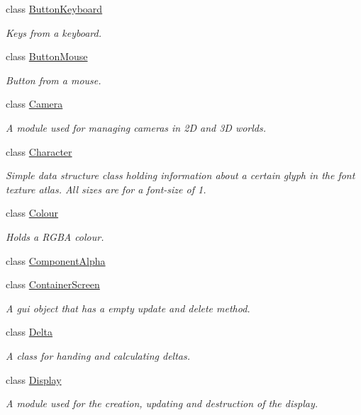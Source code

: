 \begin{DoxyCompactItemize}
class \hyperlink{class_flounder_1_1_button_keyboard}{Button\+Keyboard}
\begin{DoxyCompactList}\small\item\em Keys from a keyboard. \end{DoxyCompactList}\item 
class \hyperlink{class_flounder_1_1_button_mouse}{Button\+Mouse}
\begin{DoxyCompactList}\small\item\em Button from a mouse. \end{DoxyCompactList}\item 
class \hyperlink{class_flounder_1_1_camera}{Camera}
\begin{DoxyCompactList}\small\item\em A module used for managing cameras in 2D and 3D worlds. \end{DoxyCompactList}\item 
class \hyperlink{class_flounder_1_1_character}{Character}
\begin{DoxyCompactList}\small\item\em Simple data structure class holding information about a certain glyph in the font texture atlas. All sizes are for a font-\/size of 1. \end{DoxyCompactList}\item 
class \hyperlink{class_flounder_1_1_colour}{Colour}
\begin{DoxyCompactList}\small\item\em Holds a R\+G\+BA colour. \end{DoxyCompactList}\item 
class \hyperlink{class_flounder_1_1_component_alpha}{Component\+Alpha}
\item 
class \hyperlink{class_flounder_1_1_container_screen}{Container\+Screen}
\begin{DoxyCompactList}\small\item\em A gui object that has a empty update and delete method. \end{DoxyCompactList}\item 
class \hyperlink{class_flounder_1_1_delta}{Delta}
\begin{DoxyCompactList}\small\item\em A class for handing and calculating deltas. \end{DoxyCompactList}\item 
class \hyperlink{class_flounder_1_1_display}{Display}
\begin{DoxyCompactList}\small\item\em A module used for the creation, updating and destruction of the display. \end{DoxyCompactList}\item 

\end{DoxyCompactItemize}
